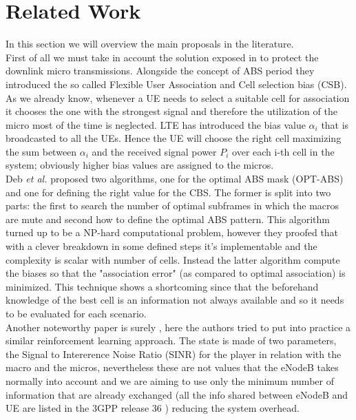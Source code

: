 \documentclass[conference,10pt]{IEEEtran}
\begin{document}
\section{Related Work}\label{sec:sota}
In this section we will overview the main proposals in the literature.\\
First of all we must take in account the solution exposed in \cite{deb2014algorithms} to protect the downlink micro transmissions. Alongside the concept of ABS period they introduced the so called Flexible User Association and Cell selection bias (CSB). As we already know, whenever a UE needs to select a suitable cell for association it chooses the one with the strongest signal and therefore the utilization of the micro most of the time is neglected. LTE has introduced the bias value $\alpha_i$ that is broadcasted to all the UEs. Hence the UE will choose the right cell maximizing the sum between $\alpha_i$ and the received signal power $P_i$ over each i-th cell in the system; obviously higher bias values are assigned to the micros.\\
Deb \textit{et al.}\cite{deb2014algorithms} proposed two algorithms, one for the optimal ABS mask (OPT-ABS) and one for defining the right value for the CBS. The former is split into two parts: the first to search the number of optimal subframes in which the macros are mute and second how to define the optimal ABS pattern. This algorithm turned up to be a NP-hard computational problem, however they proofed that with a clever breakdown in some defined steps it's implementable and the complexity is scalar with number of cells. Instead the latter algorithm compute the biases so that the "association error" (as compared to optimal association) is minimized. This technique shows a shortcoming since that the beforehand knowledge of the best cell is an information not always available and so it needs to be evaluated for each scenario.\\
Another noteworthy paper is surely \cite{simsek2013enhanced}, here the authors tried to put into practice a similar reinforcement learning approach. The state is made of two parameters, the Signal to Intererence Noise Ratio (SINR) for the player in relation with the macro and the micros, nevertheless these are not values that the eNodeB takes normally into account and we are aiming to use only the minimum number of information that are already exchanged (all the info shared between eNodeB and UE are listed in the 3GPP release 36 \cite{etsi2017136}) reducing the system overhead. 
\end{document}
